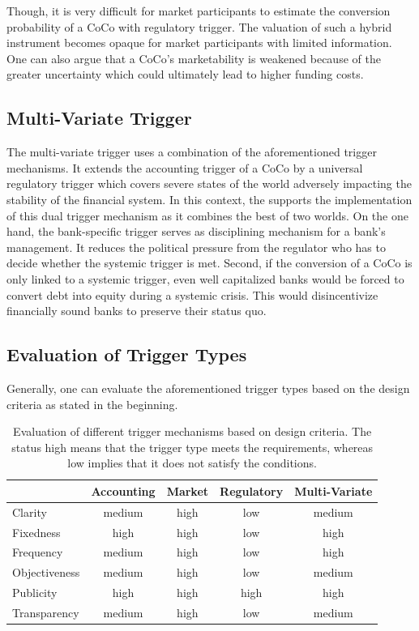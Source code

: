 Though, it is very difficult for market participants to estimate the conversion probability of a CoCo with regulatory trigger. The valuation of such a hybrid instrument becomes opaque for market participants with limited information. \citep{alvemar2012modelling} One can also argue that a CoCo's marketability is weakened because of the greater uncertainty which could ultimately lead to higher funding costs. \citep{de2014handbook} 

\subsection{Multi-Variate Trigger} \label{multivariatetrigger}

The multi-variate trigger uses a combination of the aforementioned trigger mechanisms. It extends the accounting trigger of a CoCo by a universal regulatory trigger which covers severe states of the world adversely impacting the stability of the financial system. In this context, the \citet{squam2009expedited} supports the implementation of this dual trigger mechanism as it combines the best of two worlds. On the one hand, the bank-specific trigger serves as disciplining mechanism for a bank's management. It reduces the political pressure from the regulator who has to decide whether the systemic trigger is met. Second, if the conversion of a CoCo is only linked to a systemic trigger, even well capitalized banks would be forced to convert debt into equity during a systemic crisis. This would disincentivize financially sound banks to preserve their status quo.

\subsection{Evaluation of Trigger Types}
Generally, one can evaluate the aforementioned trigger types based on the design criteria as stated in the beginning.

\begin{table}[H]
	\setlength{\extrarowheight}{2.5pt}
	\centering
	\begin{tabular}{lcccc}
		\toprule
			 & Accounting & Market & Regulatory & Multi-Variate \\
		\midrule
			Clarity & medium & high & low & medium\\
			Fixedness & high & high & low & high \\
			Frequency & medium & high & low & high\\
			Objectiveness & medium & high & low & medium \\
			Publicity & high & high & high & high \\
			Transparency & medium & high & low & medium \\
		\bottomrule
	\end{tabular}
	\caption[Evaluation of different trigger mechanisms]{Evaluation of different trigger mechanisms based on design criteria. The status high means that the trigger type meets the requirements, whereas low implies that it does not satisfy the conditions. \citep{erismann2015pricing}}
	\label{table:evaluationtrigger}
\end{table}

